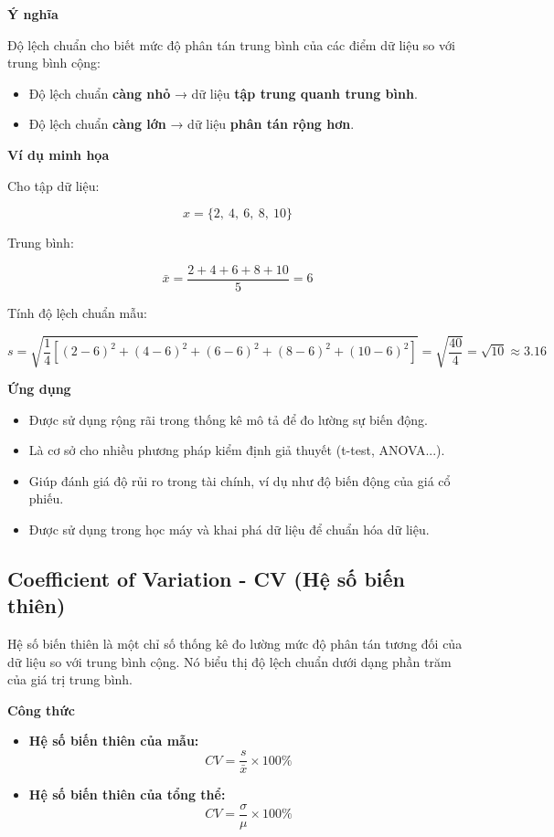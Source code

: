 \textbf{Ý nghĩa}

Độ lệch chuẩn cho biết mức độ phân tán trung bình của các điểm dữ liệu so với trung bình cộng:

\begin{itemize}
    \item Độ lệch chuẩn \textbf{càng nhỏ} → dữ liệu \textbf{tập trung quanh trung bình}.
    \item Độ lệch chuẩn \textbf{càng lớn} → dữ liệu \textbf{phân tán rộng hơn}.
\end{itemize}

\textbf{Ví dụ minh họa}

Cho tập dữ liệu:

\[
x = \{ 2,\ 4,\ 6,\ 8,\ 10 \}
\]

Trung bình:

\[
\bar{x} = \frac{2 + 4 + 6 + 8 + 10}{5} = 6
\]

Tính độ lệch chuẩn mẫu:

\[
s = \sqrt{\frac{1}{4} \left[ (2 - 6)^2 + (4 - 6)^2 + (6 - 6)^2 + (8 - 6)^2 + (10 - 6)^2 \right]} = \sqrt{\frac{40}{4}} = \sqrt{10} \approx 3.16
\]

\textbf{Ứng dụng}

\begin{itemize}
    \item Được sử dụng rộng rãi trong thống kê mô tả để đo lường sự biến động.
    \item Là cơ sở cho nhiều phương pháp kiểm định giả thuyết (t-test, ANOVA...).
    \item Giúp đánh giá độ rủi ro trong tài chính, ví dụ như độ biến động của giá cổ phiếu.
    \item Được sử dụng trong học máy và khai phá dữ liệu để chuẩn hóa dữ liệu.
\end{itemize}

\subsection{Coefficient of Variation - CV (Hệ số biến thiên)}
\label{stat:coef}

Hệ số biến thiên là một chỉ số thống kê đo lường mức độ phân tán tương đối của dữ liệu so với trung bình cộng. Nó biểu thị độ lệch chuẩn dưới dạng phần trăm của giá trị trung bình.

\textbf{Công thức}

\begin{itemize}
    \item \textbf{Hệ số biến thiên của mẫu:}
    \begin{equation}
        CV = \frac{s}{\bar{x}} \times 100\%
        \label{eq:cv-sample}
    \end{equation}
    
    \item \textbf{Hệ số biến thiên của tổng thể:}
    \begin{equation}
        CV = \frac{\sigma}{\mu} \times 100\%
        \label{eq:cv-population}
    \end{equation}
\end{itemize}

